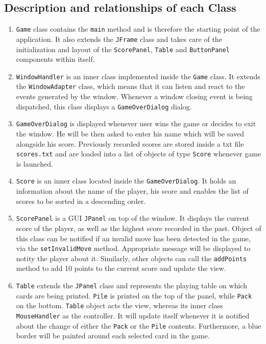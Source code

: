 \documentclass[a4paper, 11pt, titlepage]{article}
\begin{document}
\subsection{Description and relationships of each Class}
\begin{enumerate}
	\item \texttt{Game} class contains the \texttt{main} method and is therefore the 
		starting point of the application. It also extends the \texttt{JFrame} class and 
		takes care of the initialization and layout of the \texttt{ScorePanel}, 
		\texttt{Table} and \texttt{ButtonPanel} components within itself.
		
	\item \texttt{WindowHandler} is an inner class implemented inside the \texttt{Game}
		class. It extends the \texttt{WindowAdapter} class, which means that it can 
		listen and react to the events generated by the window. Whenever a window closing 
		event is being dispatched, this class displays a \texttt{GameOverDialog} dialog.
		
	\item \texttt{GameOverDialog} is displayed whenever user wins the game or decides to
		exit the window. He will be then asked to enter his name which will be saved
		alongside his score. Previously recorded scores are stored inside a txt file
		\texttt{scores.txt} and are loaded into a list of objects of type \texttt{Score}
		whenever game is launched.
		
	\item \texttt{Score} is an inner class located inside the \texttt{GameOverDialog}. 
		It holds an information about the name of the player, his score and enables the
		list of scores to be sorted in a descending order. 
		
	\item \texttt{ScorePanel} is a GUI \texttt{JPanel} on top of the window. It displays
		the current score of the player, as well as the highest score recorded in the 
		past. Object of this class can be notified if an invalid move has been detected 
		in the game, via the \texttt{setInvalidMove} method. Appropriate message will be 
		displayed to notity the player about it. Similarly, other objects can call 
		the \texttt{addPoints} method to add 10 points to the current score and update
		the view.
		
	\item \texttt{Table} extends the \texttt{JPanel} class and represents the playing 
		table on which cards are being printed. \texttt{Pile} is printed on the top of 
		the panel, while \texttt{Pack} on the bottom. \texttt{Table} object acts the 
		view, whereas its inner class \texttt{MouseHandler} as the controller. 
		It will update itself whenever it is notified about the change of
		either the \texttt{Pack} or the \texttt{Pile} contents. Furthermore, a blue border
		will be painted around each selected card in the game.
		

\end{enumerate}
\end{document}
